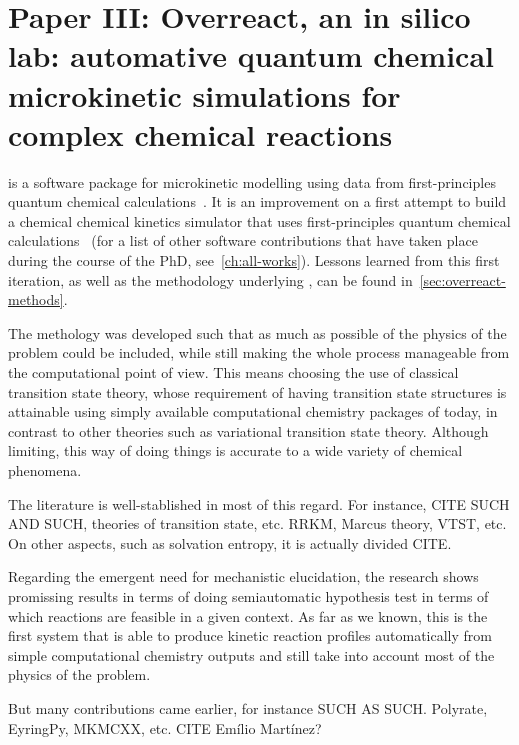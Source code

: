 \chapter{Paper III:\@
  Overreact, an in silico lab:
  \linebreak automative quantum chemical microkinetic simulations
  for complex chemical reactions
 }%
\label{ch:paper3}


\overreact is a software package for microkinetic modelling using data from
first-principles quantum chemical
calculations~\cite{Schneider2022,overreact2021zenodo}.
It is an improvement on a first attempt to build a
chemical chemical kinetics simulator that uses first-principles quantum
chemical calculations~\cite{pyrrole2019zenodo} (for a list of other software
contributions that have taken place during the course of the PhD, see~\cref{ch:all-works}).
Lessons learned from this first iteration, as well as the methodology
underlying \overreact, can be found in~\cref{sec:overreact-methods}.

The methology was developed such that as much as possible of the physics of the problem could be included,
while still making the whole process manageable from the computational point of view.
This means choosing the use of classical transition state theory,
whose requirement of having transition state structures is attainable
using simply available computational chemistry packages of today, in contrast to other theories
such as variational transition state theory.
Although limiting, this way of doing things is accurate to a wide variety of chemical phenomena.

The literature is well-stablished in most of this regard.
For instance, CITE SUCH AND SUCH, theories of transition state, etc.
RRKM, Marcus theory, VTST, etc.
On other aspects, such as solvation entropy, it is actually divided CITE.\@

Regarding the emergent need for mechanistic elucidation, the research shows promissing
results in terms of doing semiautomatic hypothesis test in terms of which reactions are feasible
in a given context.
As far as we known, this is the first system that is able to produce kinetic reaction profiles
automatically from simple computational chemistry outputs and still take into account most of the physics of the problem.

But many contributions came earlier, for instance SUCH AS SUCH.\@
Polyrate, EyringPy, MKMCXX, etc.
CITE Emílio Martínez?

